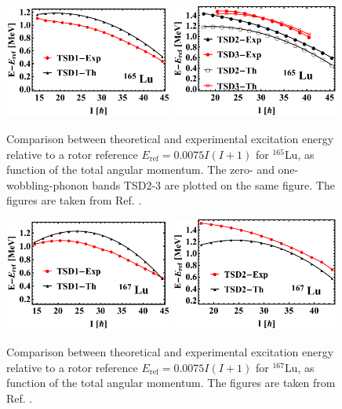 \begin{figure}
    \centering
    \includegraphics[width=0.49\textwidth]{Chapters/Figures/Lu-exp-energies/fig13a_lu165.pdf}
    \includegraphics[width=0.49\textwidth]{Chapters/Figures/Lu-exp-energies/fig13b_lu165.pdf}
    \caption{Comparison between theoretical and experimental excitation energy relative to a rotor reference $E_\text{ref}=0.0075I(I+1)$ for $^{165}$Lu, as function of the total angular momentum. The zero- and one-wobbling-phonon bands TSD2-3 are plotted on the same figure. The figures are taken from Ref. \cite{raduta2020approach}.}
    \label{reference-rotor-energy-lu165}
\end{figure}
\begin{figure}
    \centering
    \includegraphics[width=0.49\textwidth]{Chapters/Figures/Lu-exp-energies/fig14a_lu167.pdf}
    \includegraphics[width=0.49\textwidth]{Chapters/Figures/Lu-exp-energies/fig14b_lu167.pdf}
    \caption{Comparison between theoretical and experimental excitation energy relative to a rotor reference $E_\text{ref}=0.0075I(I+1)$ for $^{167}$Lu, as function of the total angular momentum. The figures are taken from Ref. \cite{raduta2020approach}.}
    \label{reference-rotor-energy-lu167}
\end{figure}
